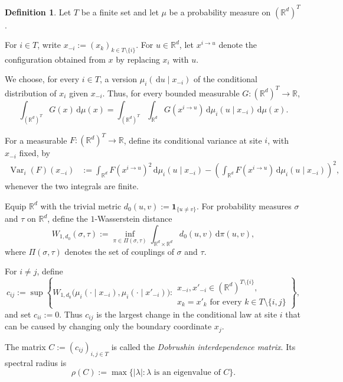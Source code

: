 \documentclass[12pt,reqno,letterpaper]{amsart}
\theoremstyle{definition}
\newtheorem{definition}[theorem]{Definition}
\theoremstyle{remark}
\numberwithin{equation}{section}
\newcommand{\R}{\mathbb R}
\newcommand{\dd}{\,\mathrm d}
\newcommand{\Var}{\operatorname{Var}}
\begin{document}
\begin{definition}
\label{def:Dobrushinmatrix}
Let \(T\) be a finite set and let \(\mu\) be a probability measure on
\((\R^d)^T\).

For \(i\in T\), write $x_{-i}:=(x_k)_{k\in T\setminus\{i\}}.$
For \(u\in\R^d\), let \(x^{i\to u}\) denote the configuration obtained
from \(x\) by replacing \(x_i\) with \(u\).

We choose, for every \(i\in T\), a version $\mu_i(\dd u\mid x_{-i})$
of the conditional distribution of \(x_i\) given \(x_{-i}\).  Thus, for
every bounded measurable \(G:(\R^d)^T\to\R\),
\[
 \int_{(\R^d)^T}G(x)\dd\mu(x)
 =
 \int_{(\R^d)^T}\int_{\R^d}
 G(x^{i\to u})\dd\mu_i(u\mid x_{-i})\dd\mu(x).
\]

For a measurable \(F:(\R^d)^T\to\R\), define its conditional variance at
site \(i\), with \(x_{-i}\) fixed, by
\begin{align*}
 \Var_i(F)(x_{-i})
 &:=
 \int_{\R^d}F(x^{i\to u})^2
 \dd\mu_i(u\mid x_{-i})-
 \left(
 \int_{\R^d}F(x^{i\to u})
 \dd\mu_i(u\mid x_{-i})
 \right)^2,
\end{align*}
whenever the two integrals are finite.

Equip \(\R^d\) with the trivial metric $d_0(u,v):=\mathbf1_{\{u\ne v\}}.$
For probability measures \(\sigma\) and \(\tau\) on \(\R^d\), define the $1$-Wasserstein distance
\[
 W_{1,d_0}(\sigma,\tau)
 :=
 \inf_{\pi\in\Pi(\sigma,\tau)}
 \int_{\R^d\times\R^d}d_0(u,v)\dd\pi(u,v),
\]
where \(\Pi(\sigma,\tau)\) denotes the set of couplings of \(\sigma\) and
\(\tau\).

For \(i\ne j\), define 
\begin{equation}\label{eq:wu-matrix}
 c_{ij}
 :=
 \sup
 \left\{
 W_{1,d_0}\bigl(
 \mu_i(\cdot\mid x_{-i}),
 \mu_i(\cdot\mid x'_{-i})
 \bigr):
 \begin{array}{l}
 x_{-i},x'_{-i}\in(\R^d)^{T\setminus\{i\}},\\
 x_k=x'_k\text{ for every }k\in T\setminus\{i,j\}
 \end{array}
 \right\},
\end{equation}
and set \(c_{ii}:=0\).  Thus \(c_{ij}\) is the largest change in the
conditional law at site \(i\) that can be caused by changing only the
boundary coordinate \(x_j\).

The matrix $C:=(c_{ij})_{i,j\in T}$
is called the \emph{Dobrushin interdependence matrix}.  Its spectral radius is
\[\rho(C) :=
 \max\{|\lambda|:\lambda\text{ is an eigenvalue of }C\}.
\]
\end{definition}
\end{document}
